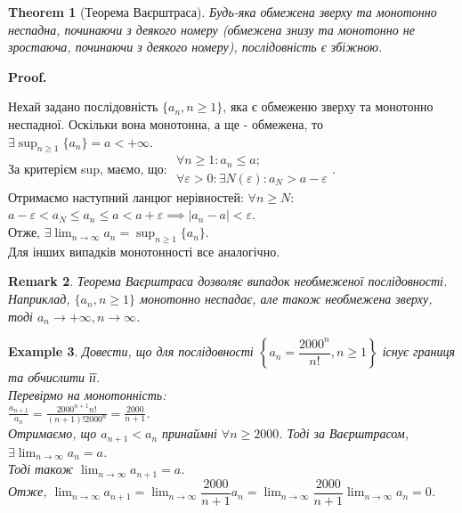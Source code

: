 \documentclass[a4paper, 14pt]{article}
\makeatletter
\def\qed{$\blacksquare$}
\theoremstyle{theoremdd}
\newtheorem{theorem}{Theorem}[subsection]
\theoremstyle{theoremdd}
\theoremstyle{theoremdd}
\theoremstyle{theoremdd}
\newtheorem{example}[theorem]{Example}
\theoremstyle{theoremdd}
\theoremstyle{theoremdd}
\newtheorem{remark}[theorem]{Remark}
\theoremstyle{theoremdd}
\theoremstyle{theoremdd}
\renewenvironment{proof}[1][Proof.\\]{\par
\pushQED{\hfill \qed}%
\normalfont \topsep6\p@\@plus6\p@\relax
\trivlist
\item\relax
{\bfseries
#1\@addpunct{.}}\hspace\labelsep\ignorespaces
}{%
\popQED\endtrivlist\@endpefalse
}
\makeatother
\begin{document}
	\begin{theorem}[Теорема Ваєрштраса]
	Будь-яка обмежена зверху та монотонно неспадна, починаючи з деякого номеру (обмежена знизу та монотонно не зростаюча, починаючи з деякого номеру), послідовність є збіжною.
	\end{theorem}
	\begin{proof}
	Нехай задано послідовність $\{a_n, n \geq 1\}$, яка є обмеженю зверху та монотонно неспадної. Оскільки вона монотонна, а ще - обмежена, то $\exists \displaystyle\sup_{n \geq 1}\{a_n\} = a < +\infty$.\\
	За критерієм sup, маємо, що: $ \begin{gathered}
	\forall n \geq 1: a_n \leq a ;\\
	\forall \varepsilon > 0: \exists N(\varepsilon): a_{N} > a - \varepsilon
	\end{gathered}$.\\
	Отримаємо наступний ланцюг нерівностей: $\forall n \geq N:$\\
	$a-\varepsilon < a_N \leq a_n \leq a < a + \varepsilon \implies |a_n-a|<\varepsilon$.\\
	Отже, $\displaystyle \exists \lim_{n \to \infty} a_n = \sup_{n \geq 1}\{a_n\}$.
	\bigskip \\
	Для інших випадків монотонності все аналогічно.
	\end{proof}
	
	\begin{remark}
	Теорема Ваєрштраса дозволяє випадок необмеженої послідовності.\\
	Наприклад, $\{a_n, n \geq 1\}$ монотонно неспадає, але також необмежена зверху, тоді $a_n \to +\infty, n \to \infty$.
	\end{remark}
	
	\begin{example}
	Довести, що для послідовності $\left\{ a_n = \dfrac{2000^n}{n!}, n \geq 1 \right\}$ існує границя та обчислити її.\\
	Перевірмо на монотонність:\\
	$\displaystyle \frac{a_{n+1}}{a_n} = \frac{2000^{n+1} n!}{(n+1)! 2000^n} = \frac{2000}{n+1}$.\\
	Отримаємо, що $a_{n+1} < a_n$ принаймні $\forall n \geq 2000$. Тоді за Ваєрштрасом, $\exists \displaystyle \lim_{n \to \infty} a_n = a$.\\
	Тоді також $\displaystyle \lim_{n \to \infty} a_{n+1} = a$.\\
	Отже, $\displaystyle \lim_{n \to \infty} a_{n+1} = \lim_{n \to \infty} \dfrac{2000}{n+1} a_n = \lim_{n \to \infty} \dfrac{2000}{n+1} \lim_{n \to \infty} a_n = 0$.
	\end{example}
	
\end{document}
